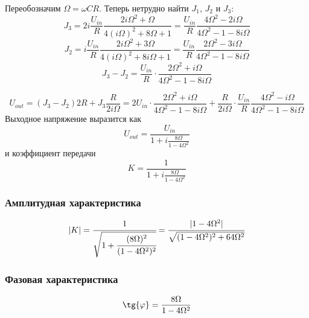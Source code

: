 Переобозначим $\Omega=\omega CR$. Теперь нетрудно найти $J_1$, $J_2$ и $J_3$:
\begin{equation}
	J_3=2i\frac{U_{in}}{R}\frac{2i\Omega^2+\Omega}{4(i\Omega)^2+8\Omega+1}=\frac{U_{in}}{R}\frac{4\Omega^2-2i\Omega }{4\Omega^2-1-8i\Omega}
\end{equation}
\begin{equation}
	J_2=i\frac{U_{in}}{R}\frac{2i\Omega^2 +3\Omega}{4(i\Omega)^2+8i\Omega+1}=\frac{U_{in}}{R}\frac{2\Omega^2-3i\Omega}{4\Omega^2-1-8i\Omega}
\end{equation}
\begin{equation}
	J_3-J_2=\frac{U_{in}}{R}\cdot\frac{2\Omega^2 +i\Omega }{4\Omega^2-1-8i\Omega}
\end{equation}

\begin{equation}
	U_{out}=(J_3-J_2)2R+J_3\frac{R}{2i\Omega}=2U_{in}
	\cdot\frac{2\Omega^2+i\Omega}
	{4\Omega^2-1-8i\Omega}+
	\frac{R}{2i\Omega}\cdot \frac
	{U_{in}}{R}\frac{4\Omega^2-i\Omega}
	{4\Omega^2-1-8i\Omega}
\end{equation}
Выходное напряжение выразится как
\begin{equation}
	U_{out}=\frac{U_{in}}{1+i\frac{8\Omega}{1-4\Omega^2}}
\end{equation}
и коэффициент передачи
\begin{equation}
	K=\frac{1}{1+i\frac{8\Omega}{1-4\Omega^2}}
\end{equation}
\subsubsection{Амплитудная характеристика}
\begin{equation}
	|K|=\cfrac{1}{\sqrt{1+\cfrac{(8\Omega)^2}{(1-4\Omega^2)^2}}}=\cfrac{|1-4\Omega^2|}{\sqrt{(1-4\Omega^2)^2+64\Omega^2}}
\end{equation}
\subsubsection{Фазовая характеристика}
\begin{equation}
	\tg{\phi}=\frac{8\Omega}{1-4\Omega^2}
\end{equation}

